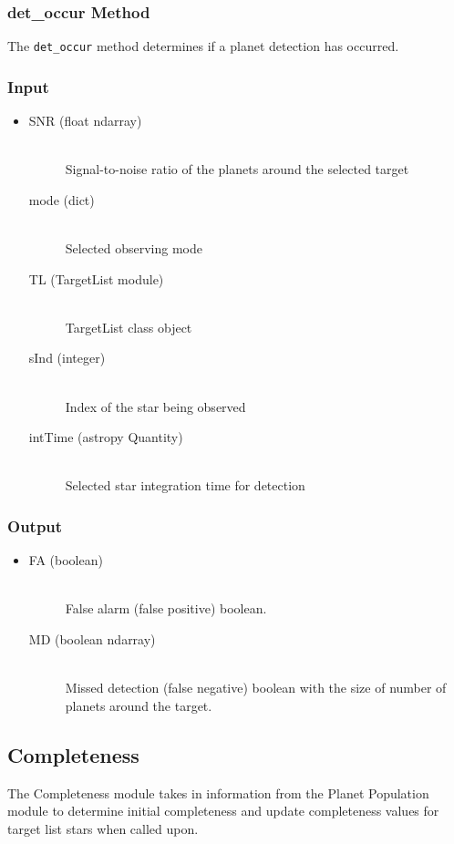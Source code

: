 \documentclass[cleanfoot]{asme2ej}
\begin{document}
\subsubsection{det\_occur Method} \label{sec:detoccurtask}
The \verb+det_occur+ method determines if a planet detection has occurred.

\subsubsection*{Input}
\begin{itemize}
\item 
\begin{description}
    \item[SNR (float ndarray)] \hfill \\ Signal-to-noise ratio of the planets around the selected target
    \item[mode (dict)] \hfill \\ Selected observing mode
    \item[TL (TargetList module)] \hfill \\ TargetList class object
    \item[sInd (integer)] \hfill \\ Index of the star being observed
    \item[intTime (astropy Quantity)] \hfill \\ Selected star integration time for detection
\end{description}
\end{itemize}

\subsubsection*{Output}
\begin{itemize}
\item 
\begin{description}
    \item[FA (boolean)] \hfill \\ False alarm (false positive) boolean.
    \item[MD (boolean ndarray)] \hfill \\ Missed detection (false negative) boolean with the size of number of planets around the target.
\end{description}
\end{itemize}



\subsection{Completeness}\label{sec:completeness}
The Completeness module takes in information from the Planet Population module to determine initial completeness and update completeness values for target list stars when called upon.
\end{document}
